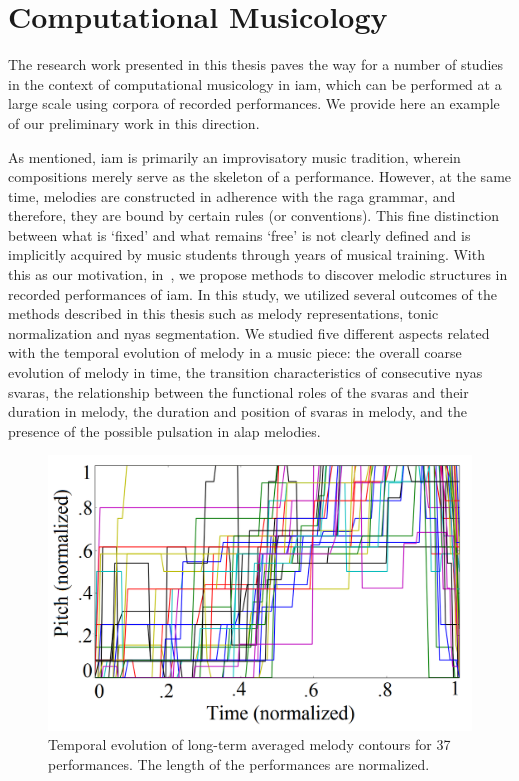 \section{Computational Musicology}

The research work presented in this thesis paves the way for a number of studies in the context of computational musicology in \gls{iam}, which can be performed at a large scale using corpora of recorded performances. We provide here an example of our preliminary work in this direction. 

As mentioned, \gls{iam} is primarily an improvisatory music tradition, wherein compositions merely serve as the skeleton of a performance. However, at the same time, melodies are constructed in adherence with the \gls{raga} grammar, and therefore, they are bound by certain rules (or conventions). This fine distinction between what is `fixed' and what remains `free' is not clearly defined and is implicitly acquired by music students through years of musical training. With this as our motivation, in~\cite{kaustuv_ismir_2016}, we propose methods to discover melodic structures in recorded performances of \gls{iam}. In this study, we utilized several outcomes of the methods described in this thesis such as melody representations, tonic normalization and \gls{nyas} segmentation. We studied five different aspects related with the temporal evolution of melody in a music piece: the overall coarse evolution of melody in time, the transition characteristics of consecutive \gls{nyas} \glspl{svara}, the relationship between the functional roles of the \glspl{svara} and their duration in melody, the duration and position of \glspl{svara} in melody, and the presence of the possible pulsation in \gls{alap} melodies. 

\begin{figure}
	\begin{center}
		\includegraphics[width=\figSizeSeventy]{ch08_applications/figures/Fig-5.png}
	\end{center}
	\caption{Temporal evolution of long-term averaged melody contours for 37 performances. The length of the performances are normalized.}
	\label{fig:temporal_evolution}
\end{figure}

